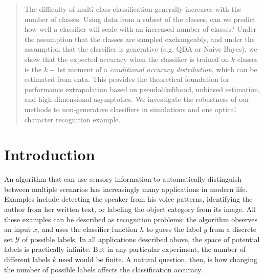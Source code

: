 \documentclass[12pt]{article}
\begin{document}
\maketitle

\newcommand{\skone}{\mathcal{S}_{k_1}}
\newcommand{\sktwo}{\mathcal{S}_{k_2}}

\newcommand{\tr}{\text{tr}}
\newcommand{\E}{\textbf{E}}
\newcommand{\diag}{\text{diag}}
\newcommand{\argmax}{\text{argmax}}
\newcommand{\Cov}{\text{Cov}}
\newcommand{\Var}{\text{Var}}
\newcommand{\argmin}{\text{argmin}}
\newcommand{\Vol}{\text{Vol}}
\newcommand{\comm}[1]{}
\newcommand{\indep}{\rotatebox[origin=c]{90}{$\models$}}
\newcommand{\Cor}{\text{Cor}}
\newtheorem{theorem}{Theorem}[section]
\newtheorem{proposition}{Proposition}[section]
\newtheorem{corollary}{Corollary}[theorem]
\newtheorem{lemma}{Lemma}[section]
\newtheorem{definition}{Definition}[section]
\newcommand{\bZ}{\boldsymbol{Z}}
\newcommand{\bz}{\boldsymbol{z}}
\newcommand{\bx}{\boldsymbol{x}}
\newcommand{\bX}{\boldsymbol{X}}

\newcommand{\bH}{\boldsymbol{H}}


\begin{abstract}
The difficulty of multi-class classification generally increases with
the number of classes.  Using data from a subset of the classes, can
we predict how well a classifier will scale with an increased number
of classes?  Under the assumption that the classes are sampled
exchangeably, and under the assumption that the classifier is
generative (e.g. QDA or Naive Bayes), we show that the expected
accuracy when the classifier is trained on $k$ classes is the $k-1$st
moment of a \emph{conditional accuracy distribution}, which can be
estimated from data.  This provides the theoretical foundation for
performance extrapolation based on pseudolikelihood, unbiased
estimation, and high-dimensional asymptotics.  We investigate the
robustness of our methods to non-generative classifiers in simulations
and one optical character recognition example.
\end{abstract}

\section{Introduction}\label{sec:recog_tasks}

An algorithm that can use sensory information to automatically
 distinguish between multiple scenarios has increasingly many applications
 in modern life. Examples include detecting the speaker from his voice patterns, 
identifying the author from her written text, or labeling the object 
category from its image. All these examples can be described as recognition problems:
the algorithm observes an input $x$, and uses the classifier function $h$ to guess
the label $y$ from a discrete set $\mathcal{Y}$ of possible labels. 
In all applications described above, the space of potential labels is practically infinite.
But in any particular experiment, the number of different labels $k$ used would be finite.
A natural question, then, is how changing the number of 
possible labels affects the classification accuracy. 
\end{document}

